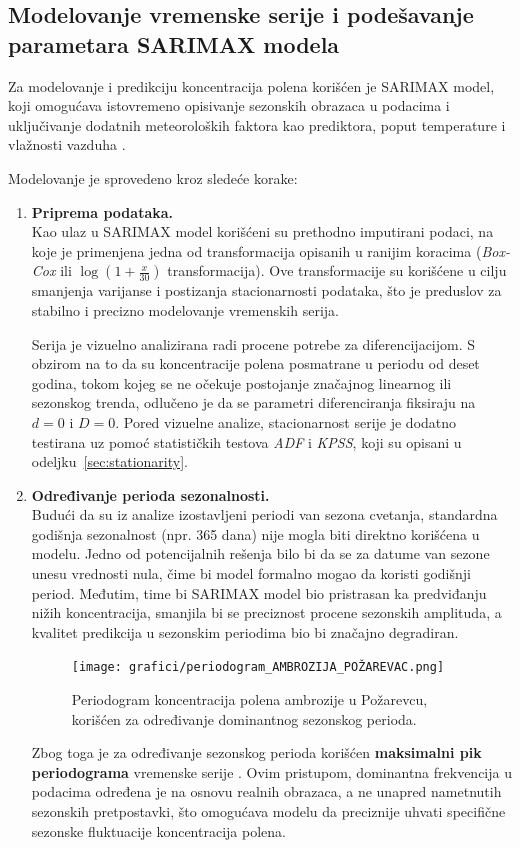 \documentclass[12pt]{article}
\begin{document}
\subsection{Modelovanje vremenske serije i podešavanje parametara SARIMAX modela}

Za modelovanje i predikciju koncentracija polena korišćen je SARIMAX model, koji omogućava istovremeno opisivanje sezonskih obrazaca u podacima i uključivanje dodatnih meteoroloških faktora kao prediktora, poput temperature i vlažnosti vazduha \cite{box1970, brockwell2002, hyndman2018forecasting}.

Modelovanje je sprovedeno kroz sledeće korake:

\begin{enumerate}
    \item \textbf{Priprema podataka.} \\
    Kao ulaz u SARIMAX model korišćeni su prethodno imputirani podaci, na koje je primenjena jedna od transformacija opisanih u ranijim koracima (\textit{Box-Cox} ili $\log(1 + \frac{x}{30})$ transformacija). Ove transformacije su korišćene u cilju smanjenja varijanse i postizanja stacionarnosti podataka, što je preduslov za stabilno i precizno modelovanje vremenskih serija.

    Serija je vizuelno analizirana radi procene potrebe za diferencijacijom. S obzirom na to da su koncentracije polena posmatrane u periodu od deset godina, tokom kojeg se ne očekuje postojanje značajnog linearnog ili sezonskog trenda, odlučeno je da se parametri diferenciranja fiksiraju na $d=0$ i $D=0$.
    Pored vizuelne analize, stacionarnost serije je dodatno testirana uz pomoć statističkih testova \textit{ADF} i \textit{KPSS}, koji su opisani u odeljku~\ref{sec:stationarity}.


    \item \textbf{Određivanje perioda sezonalnosti.} \\
    Budući da su iz analize izostavljeni periodi van sezona cvetanja, standardna godišnja sezonalnost (npr. 365 dana) nije mogla biti direktno korišćena u modelu. Jedno od potencijalnih rešenja bilo bi da se za datume van sezone unesu vrednosti nula, čime bi model formalno mogao da koristi godišnji period. Međutim, time bi SARIMAX model bio pristrasan ka predviđanju nižih koncentracija, smanjila bi se preciznost procene sezonskih amplituda, a kvalitet predikcija u sezonskim periodima bio bi značajno degradiran.

    \begin{figure}[H]
        \centering
        \texttt{[image: grafici/periodogram\_AMBROZIJA\_POŽAREVAC.png]}
        \caption{Periodogram koncentracija polena ambrozije u Požarevcu, korišćen za određivanje dominantnog sezonskog perioda.}
        \label{fig:periodogram_ambrozija}
    \end{figure}
    Zbog toga je za određivanje sezonskog perioda korišćen \textbf{maksimalni pik periodograma} vremenske serije \cite{yule1927, slutsky1937}. Ovim pristupom, dominantna frekvencija u podacima određena je na osnovu realnih obrazaca, a ne unapred nametnutih sezonskih pretpostavki, što omogućava modelu da preciznije uhvati specifične sezonske fluktuacije koncentracija polena.



\end{enumerate}
\end{document}
